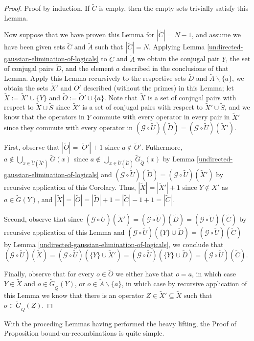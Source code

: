 \documentclass[twocolumn,showpacs,preprintnumbers,amsmath,amssymb,nofootinbib,pra,floatfix]{revtex4-1}
\newenvironment{remark}[1][Remark]{\begin{trivlist}
\item[\hskip \labelsep {\bfseries #1}]}{\end{trivlist}}
\newcommand{\set}{\tilde}
\newcommand{\genfun}{\mathcal{G}}
\begin{document}
\begin{proof}
Proof by induction.  If $\set C$ is empty, then the empty sets trivially satisfy this Lemma.

Now suppose that we have proven this Lemma for $|\set C|=N-1$, and assume we have been given sets $\set C$ and $\set A$ such that $|\set C|=N$.  Applying Lemma \ref{undirected-gaussian-elimination-of-logicals} to $\set C$ and $\set A$ we obtain the conjugal pair $Y$,  the set of conjugal pairs $\set D$, and the element $a$ described in the conclusions of that Lemma.  Apply this Lemma recursively to the respective sets $\set D$ and $\set A\backslash\{a\}$, we obtain the sets $\set X'$ and $\set O'$ described (without the primes) in this Lemma; let $\set X := \set X'\cup\{Y\}$ and $\set O:=\set O'\cup\{a\}$.  Note that $\set X$ is a set of conjugal pairs with respect to $\set X\cup\set S$ since $\set X'$ is a set of conjugal pairs with respect to $\set X'\cup\set S$, and we know that the operators in $Y$ commute with every operator in every pair in $\set X'$ since they commute with every operator in $(\genfun\circ\set U)(\set D)=(\genfun\circ\set U)(\set X')$.

First, observe that $|\set O|=|\set O'|+1$ since $a\notin \set O'$.  Futhermore, $a\notin \bigcup_{x\in \set U(\set X')} \set G(x)$ since $a\notin \bigcup_{x\in \set U(\set D)} \set G_{\set Q}(x)$ by Lemma \ref{undirected-gaussian-elimination-of-logicals} and $(\genfun\circ\set U)(\set D)=(\genfun\circ\set U)(\set X')$ by recursive application of this Corolary.  Thus, $|\set X|=|\set X'|+1$ since $Y\notin X'$ as $a\in\set G(Y)$, and $|\set X|=|\set O|=|\set D|+1=|\set C|-1+1=|\set C|$.

Second, observe that since $(\genfun\circ\set U)(\set X')=(\genfun\circ\set U)(\set D)=(\genfun\circ\set U)(\set C)$ by recursive application of this Lemma and $(\genfun\circ\set U)(\{Y\}\cup\set D)=(\genfun\circ\set U)(\set C)$ by Lemma \ref{undirected-gaussian-elimination-of-logicals}, we conclude that $(\genfun\circ\set U)(\set X) = (\genfun\circ\set U)(\{Y\}\cup\set X') = (\genfun\circ\set U)(\{Y\}\cup\set D) = (\genfun\circ\set U)(\set C)$.

Finally, observe that for every $o\in\set O$ we either have that $o=a$, in which case $Y\in\set X$ and $o\in\set G_{\set Q}(Y)$, or $o\in \set A\backslash\{a\}$, in which case by recursive application of this Lemma we know that there is an operator $Z\in \set X'\subseteq \set X$ such that $o\in\set G_{\set Q}(Z)$.
\end{proof}
\begin{remark}
With the proceding Lemmas having performed the heavy lifting, the Proof of Proposition {bound-on-recombinations} is quite simple.
\end{remark}
\end{document}
